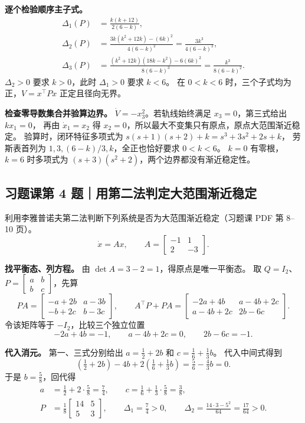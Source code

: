 \documentclass[UTF8,a4paper,11pt,fontset=fandol]{ctexart}
\begin{document}
\textbf{逐个检验顺序主子式。}
\[
\begin{aligned}
 \Delta_1(P)&=\frac{k(k+12)}{2(6-k)},\\
 \Delta_2(P)&=\frac{3k(k^2+12k)-(6k)^2}{4(6-k)^2}
             =\frac{3k^3}{4(6-k)^2},\\
 \Delta_3(P)&=\frac{(k^2+12k)(18k-k^2)-6(6k)^2}{8(6-k)^3}
             =\frac{k^3}{8(6-k)^2}.
\end{aligned}
\]
$\Delta_2>0$ 要求 $k>0$，此时 $\Delta_1>0$ 要求 $k<6$。
在 $0<k<6$ 时，三个子式均为正，$V=x^\top Px$ 正定且径向无界。

\textbf{检查零导数集合并验算边界。}
$\dot V=-x_3^2$。若轨线始终满足 $x_3=0$，第三式给出 $kx_1=0$，
再由 $\dot x_1=x_2$ 得 $x_2=0$，所以最大不变集只有原点，原点大范围渐近稳定。
验算时，闭环特征多项式为 $s(s+1)(s+2)+k=s^3+3s^2+2s+k$，
劳斯表首列为 $1,3,(6-k)/3,k$，全正也恰好要求 $\boxed{0<k<6}$。
$k=0$ 有零根，$k=6$ 时多项式为 $(s+3)(s^2+2)$，两个边界都没有渐近稳定性。

\newpage
\subsection*{习题课第 4 题｜用第二法判定大范围渐近稳定}\label{prob:exercise4}
利用李雅普诺夫第二法判断下列系统是否为大范围渐近稳定（习题课 PDF 第 8--10 页）。
\[
   \dot x=Ax,\qquad A=\begin{bmatrix}-1&1\\2&-3\end{bmatrix}.
\]

\textbf{找平衡态、列方程。} 由 $\det A=3-2=1$，得原点是唯一平衡态。
取 $Q=I_2$、$P=\begin{bmatrix}a&b\\b&c\end{bmatrix}$，先算
\[
 PA=\begin{bmatrix}-a+2b&a-3b\\-b+2c&b-3c\end{bmatrix},\qquad
 A^\top P+PA
 =\begin{bmatrix}-2a+4b&a-4b+2c\\a-4b+2c&2b-6c\end{bmatrix}.
\]
令该矩阵等于 $-I_2$，比较三个独立位置
\[
    -2a+4b=-1,\qquad a-4b+2c=0,\qquad 2b-6c=-1 .
\]

\textbf{代入消元。}
第一、三式分别给出 $a=\tfrac12+2b$ 和 $c=\tfrac16+\tfrac13 b$。
代入中间式得到
\[
    \left(\tfrac12+2b\right)-4b+2\left(\tfrac16+\tfrac13 b\right)
    =\tfrac56-\tfrac43 b=0 .
\]
于是 $b=\tfrac58$，回代得
\[
 \begin{aligned}
   a&=\tfrac12+2\cdot\tfrac58=\tfrac74,\qquad
   c=\tfrac16+\tfrac13\cdot\tfrac58=\tfrac38,\\
   P&=\frac18\begin{bmatrix}14&5\\5&3\end{bmatrix},\qquad
   \Delta_1=\frac74>0,\qquad
   \Delta_2=\frac{14\cdot3-5^2}{64}=\frac{17}{64}>0 .
 \end{aligned}
\]
\end{document}

